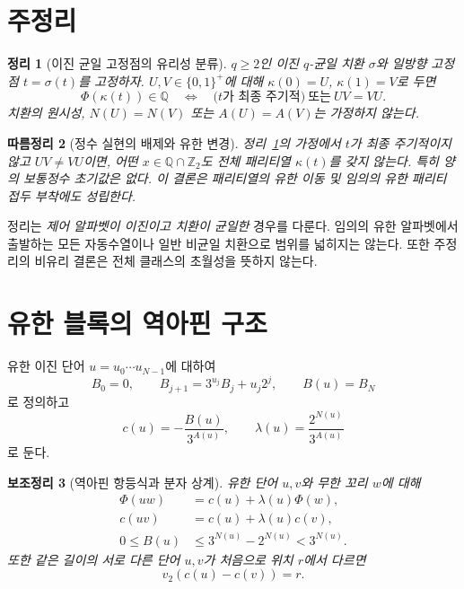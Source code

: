 \documentclass[11pt,a4paper]{article}
\theoremstyle{koreanplain}
\newtheorem{theorem}{정리}[section]
\newtheorem{lemma}[theorem]{보조정리}
\newtheorem{corollary}[theorem]{따름정리}
\newcommand{\Q}{\mathbb Q}
\newcommand{\Z}{\mathbb Z}
\newcommand{\vTwo}{v_2}
\begin{document}
\section{주정리}

\begin{theorem}[이진 균일 고정점의 유리성 분류]\label{thm:main}
$q\ge2$인 이진 $q$-균일 치환 $\sigma$와 일방향 고정점 $t=\sigma(t)$를 고정하자. $U,V\in\{0,1\}^{+}$에 대해 $\kappa(0)=U$, $\kappa(1)=V$로 두면
\begin{equation}\label{eq:main}
\Phi(\kappa(t))\in\Q
\quad\Longleftrightarrow\quad
\bigl(t\text{가 최종 주기적}\bigr)\ \text{또는}\ UV=VU.
\end{equation}
치환의 원시성, $N(U)=N(V)$ 또는 $A(U)=A(V)$는 가정하지 않는다.
\end{theorem}

\begin{corollary}[정수 실현의 배제와 유한 변경]\label{cor:integer}
정리~\ref{thm:main}의 가정에서 $t$가 최종 주기적이지 않고 $UV\ne VU$이면, 어떤 $x\in\Q\cap\Z_2$도 전체 패리티열 $\kappa(t)$를 갖지 않는다. 특히 양의 보통정수 초기값은 없다. 이 결론은 패리티열의 유한 이동 및 임의의 유한 패리티 접두 부착에도 성립한다.
\end{corollary}

정리는 \emph{제어 알파벳이 이진이고 치환이 균일한} 경우를 다룬다. 임의의 유한 알파벳에서 출발하는 모든 자동수열이나 일반 비균일 치환으로 범위를 넓히지는 않는다. 또한 주정리의 비유리 결론은 전체 클래스의 초월성을 뜻하지 않는다.

\section{유한 블록의 역아핀 구조}

유한 이진 단어 $u=u_0\cdots u_{N-1}$에 대하여
\begin{equation}\label{eq:B}
B_0=0,\qquad B_{j+1}=3^{u_j}B_j+u_j2^j,\qquad B(u)=B_N
\end{equation}
로 정의하고
\begin{equation}\label{eq:clambda}
c(u)=-\frac{B(u)}{3^{A(u)}},\qquad
\lambda(u)=\frac{2^{N(u)}}{3^{A(u)}}
\end{equation}
로 둔다.

\begin{lemma}[역아핀 항등식과 분자 상계]\label{lem:affine}
유한 단어 $u,v$와 무한 꼬리 $w$에 대해
\begin{align}
\Phi(uw)&=c(u)+\lambda(u)\Phi(w),\label{eq:affine}\\
c(uv)&=c(u)+\lambda(u)c(v),\label{eq:concat}\\
0\le B(u)&\le3^{N(u)}-2^{N(u)}<3^{N(u)}.\label{eq:Bbound}
\end{align}
또한 같은 길이의 서로 다른 단어 $u,v$가 처음으로 위치 $r$에서 다르면
\begin{equation}\label{eq:isometry}
\vTwo(c(u)-c(v))=r.
\end{equation}
\end{lemma}
\end{document}
